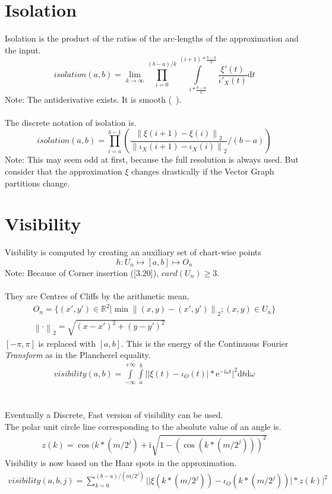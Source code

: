 \documentclass{report}
\newcommand\norm[1]{\left\lVert#1\right\rVert}
\begin{document}
\chapter{Isolation}
Isolation is the product of the ratios of the arc-lengths of the approximation and the input.
\begin{equation}
isolation(a,b)=\lim _{k\rightarrow\infty} \prod _{i=0}^{(b-a)/k} \int \limits _{i*\frac{b-a}{k}}^{(i+1)*\frac{b-a}{k}} \frac{\xi'(t)}{\iota'_{X}(t)} \mathrm{d}t
\end{equation}
Note: The antiderivative exists. It is smooth (~\cite[Riemann Integrable]{Widon}).\\\\
The discrete notation of isolation is.
\begin{equation}
isolation(a,b)= \prod _{i=a}^{b-1} (\frac{\norm{\xi(i+1)-\xi(i)}_{2}}{\norm{\iota_{X}(i+1)-\iota_{X}(i)}_{2}}/(b-a))
\end{equation}
Note: This may seem odd at first, because the full resolution is always used. But consider that the approximation $\xi$ changes drastically if the Vector Graph partitions change.

\chapter{Visibility}
Visibility is computed by creating an auxiliary set of chart-wise points
\begin{equation}
h: U_{n} \mapsto [a,b] \mapsto O_{n}
\end{equation}
Note: Because of Corner insertion (\cite{Stopeight}[3.20]), $card(U_{n}) \geq 3$.\\\\
They are Centres of Cliffs by the arithmetic mean,
\begin{align}
O_{n}=\{(x',y') \in \mathbb{R}^2 \vert \min \norm{(x,y)-(x',y')}_{2};(x,y) \in U_{n} \}\\
\norm{\cdot}_{2}=\sqrt{(x-x')^2 + (y-y')^2}
\end{align}
$[-\pi,\pi]$ is replaced with $[a,b]$. This is the energy of the Continuous Fourier \emph{Transform} as in the Plancherel equality.
\begin{align}
visibility(a,b)= \int \limits _{-\infty}^{+\infty}\int \limits _{a}^{b}\lvert \vert \xi(t)-\iota_{O}(t)\vert * \mathrm{e}^{-\mathrm{i}\omega t} \rvert^2 \mathrm{d}t \mathrm{d}\omega
\end{align}\\\\
Eventually a Discrete, Fast version of visibility can be used.\\
The polar unit circle line corresponding to the absolute value of an angle is.
\begin{align}
z(k) = \cos(k*(m/2^j) + \mathrm{i}\sqrt{1-(\cos(k*(m/2^j)))^2}
\end{align}
Visibility is now based on the Haar spots in the approximation.
\begin{align}
visibility(a,b,j)= \sum _{k=0}^{(b-a)/(m/2^j)}\lvert \vert \xi(k*(m/2^j))-\iota_{O}(k*(m/2^j))\vert * z(k) \rvert^2
\end{align}
\end{document}
